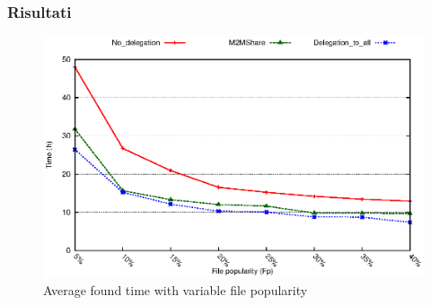 \documentclass{beamer}
\begin{document}
\begin{frame}
\label{diversa pop}
\frametitle{Risultati}
\begin{center}
\begin{figure}[ht]
\includegraphics[scale=0.7]{tempiVFDiversaPop_zoom.eps}
    \caption{Average found time with variable file popularity}
\end{figure}
\end{center}
\end{frame}
%
%
%
\end{document}
